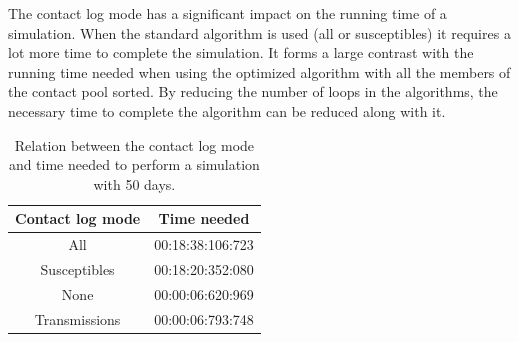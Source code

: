 \documentclass[runningheads]{llncs}
\begin{document}
The contact log mode has a significant impact on the running time of a simulation. When the standard algorithm is used (all or susceptibles) it requires a lot more time to complete the simulation. It forms a large contrast with the running time needed when using the optimized algorithm with all the members of the contact pool sorted. By reducing the number of loops in the algorithms, the necessary time to complete the algorithm can be reduced along with it.
\begin{table}
	\caption{Relation between the contact log mode and time needed to perform a simulation with 50 days.}
\begin{center}
	\begin{tabular}{ | c | c |}
		\hline
		Contact log mode & Time needed \\ \hline
		All & 00:18:38:106:723 \\ \hline
		Susceptibles & 00:18:20:352:080 \\ \hline
		None & 00:00:06:620:969 \\ \hline
		Transmissions & 00:00:06:793:748 \\
		\hline	
	\end{tabular}
\end{center}
\end{table}
\end{document}
